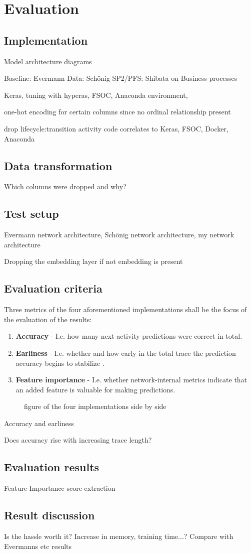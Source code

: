\chapter{Evaluation}\label{chap:evaluation}


\section{Implementation}
Model architecture diagrams

Baseline: Evermann
Data: Schönig
SP2/PFS: Shibata on Business processes

Keras, tuning with hyperas, FSOC, Anaconda environment,

one-hot encoding for certain columns since no ordinal relationship present

drop lifecycle:transition
activity code correlates to 
Keras, FSOC, Docker, Anaconda

\section{Data transformation}
Which columns were dropped and why?

\section{Test setup}
Evermann network architecture, Schönig network architecture, my network architecture

Dropping the embedding layer if not embedding is present

\section{Evaluation criteria}
Three metrics of the four aforementioned implementations shall be the focus of the evaluation of the results:
\begin{enumerate}
    \item\textbf{Accuracy} - I.e. how many next-activity predictions were correct in total.
    \item\textbf{Earliness} - I.e. whether and how early in the total trace the prediction accuracy begins to stabilize \cite{francescomarino2015}.
    \item\textbf{Feature importance} - I.e. whether network-internal metrics indicate that an added feature is valuable for making predictions.
\end{enumerate}

\begin{figure}
    \centering
    \caption{figure of the four implementations side by side}
    \label{fig:my_label}
\end{figure}

Accuracy and earliness

Does accuracy rise with increasing trace length?

\section{Evaluation results}
Feature Importance score extraction

\section{Result discussion}
Is the hassle worth it?
Increase in memory, training time...?
Compare with Evermanns etc results